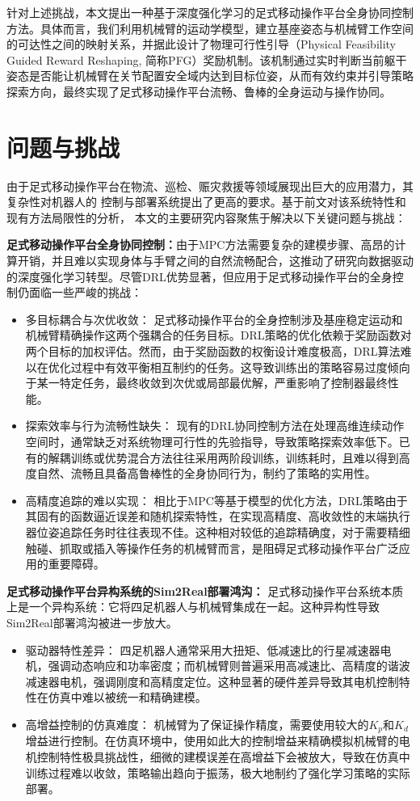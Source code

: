 针对上述挑战，本文提出一种基于深度强化学习的足式移动操作平台全身协同控制方法。具体而言，我们利用机械臂的运动学模型，建立基座姿态与机械臂工作空间的可达性之间的映射关系，并据此设计了物理可行性引导（Physical Feasibility Guided Reward Reshaping, 简称PFG）奖励机制。该机制通过实时判断当前躯干姿态是否能让机械臂在关节配置安全域内达到目标位姿，从而有效约束并引导策略探索方向，最终实现了足式移动操作平台流畅、鲁棒的全身运动与操作协同。

\section{问题与挑战}
由于足式移动操作平台在物流、巡检、赈灾救援等领域展现出巨大的应用潜力，其复杂性对机器人的
控制与部署系统提出了更高的要求。基于前文对该系统特性和现有方法局限性的分析，
本文的主要研究内容聚焦于解决以下关键问题与挑战：

\textbf{足式移动操作平台全身协同控制：}由于MPC方法需要复杂的建模步骤、高昂的计算开销，并且难以实现身体与手臂之间的自然流畅配合，这推动了研究向数据驱动的深度强化学习转型。尽管DRL优势显著，但应用于足式移动操作平台的全身控制仍面临一些严峻的挑战：
\begin{itemize}
    \item 多目标耦合与次优收敛： 足式移动操作平台的全身控制涉及基座稳定运动和机械臂精确操作这两个强耦合的任务目标。DRL策略的优化依赖于奖励函数对两个目标的加权评估。然而，由于奖励函数的权衡设计难度极高，DRL算法难以在优化过程中有效平衡相互制约的任务\cite{fu2023deep}。这导致训练出的策略容易过度倾向于某一特定任务，最终收敛到次优或局部最优解，严重影响了控制器最终性能。
    \item 探索效率与行为流畅性缺失： 现有的DRL协同控制方法在处理高维连续动作空间时，通常缺乏对系统物理可行性的先验指导，导致策略探索效率低下。已有的解耦训练或优势混合方法往往采用两阶段训练，训练耗时，且难以得到高度自然、流畅且具备高鲁棒性的全身协同行为，制约了策略的实用性。
    \item 高精度追踪的难以实现： 相比于MPC等基于模型的优化方法，DRL策略由于其固有的函数逼近误差和随机探索特性，在实现高精度、高收敛性的末端执行器位姿追踪任务时往往表现不佳。这种相对较低的追踪精确度，对于需要精细触碰、抓取或插入等操作任务的机械臂而言，是阻碍足式移动操作平台广泛应用的重要障碍。
\end{itemize}

\textbf{足式移动操作平台异构系统的Sim2Real部署鸿沟：}
足式移动操作平台系统本质上是一个异构系统：它将四足机器人与机械臂集成在一起。这种异构性导致Sim2Real部署鸿沟被进一步放大。
\begin{itemize}
    \item 驱动器特性差异： 四足机器人通常采用大扭矩、低减速比的行星减速器电机，强调动态响应和功率密度；而机械臂则普遍采用高减速比、高精度的谐波减速器电机，强调刚度和高精度定位。这种显著的硬件差异导致其电机控制特性在仿真中难以被统一和精确建模。
    \item 高增益控制的仿真难度： 机械臂为了保证操作精度，需要使用较大的$K_p$和$K_d$增益进行控制。在仿真环境中，使用如此大的控制增益来精确模拟机械臂的电机控制特性极具挑战性，细微的建模误差在高增益下会被放大，导致在仿真中训练过程难以收敛，策略输出趋向于振荡，极大地制约了强化学习策略的实际部署。
\end{itemize}

